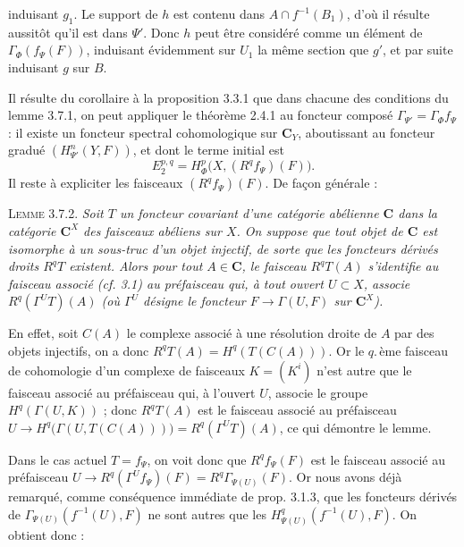 
\noindent induisant $g_1$. Le support de $h$ est contenu dans
$A\cap f^{-1}(B_1)$, d'où il résulte aussitôt qu'il est dans $\Psi'$. Donc
$h$ peut être considéré comme un élément de $\Gamma_\Phi(f_\Psi(F))$,
induisant évidemment sur $U_1$ la même section que $g'$, et par suite
induisant $g$ sur $B$.

Il résulte du corollaire à la proposition 3.3.1 que dans chacune des conditions
du lemme 3.7.1, on peut appliquer le théorème 2.4.1 au foncteur composé
$\Gamma_{\Psi'}=\Gamma_\Phi f_\Psi$ : il existe un foncteur spectral
cohomologique sur $\mathbf C_Y$, aboutissant au foncteur gradué
$(H^n_{\Psi'}(Y,F))$, et dont le terme initial est
\[
E_2^{p,q}=H^p_\Phi\bigl(X,(R^qf_\Psi)(F)\bigr).
\]
Il reste à expliciter les faisceaux $(R^qf_\Psi)(F)$. De façon générale :

\textsc{Lemme 3.7.2.} \textit{Soit $T$ un foncteur covariant
d'une catégorie abélienne $\mathbf C$ dans la catégorie $\mathbf C^X$ des faisceaux abéliens
sur $X$. On suppose que tout objet de $\mathbf C$ est isomorphe à un sous-truc d'un
objet injectif, de sorte que les foncteurs dérivés droits $R^qT$ existent.
Alors pour tout $A\in\mathbf C$, le faisceau $R^qT(A)$ s'identifie au faisceau associé
\textup{(}cf. \textup{3.1)} au préfaisceau qui, à tout ouvert $U\subset X$, associe
$R^q(\Gamma^U T)(A)$ \textup{(}où $\Gamma^U$ désigne le foncteur
$F\to\Gamma(U,F)$ sur $\mathbf C^X$\textup{)}.}

En effet, soit $C(A)$ le complexe associé à une résolution droite de $A$ par
des objets injectifs, on a donc $R^qT(A)=H^q(T(C(A)))$. Or le $q.$\,ème
faisceau de cohomologie d'un complexe de faisceaux $K=(K^i)$ n'est autre que
le faisceau associé au préfaisceau qui, à l'ouvert $U$, associe le groupe
$H^q(\Gamma(U,K))$ ; donc $R^qT(A)$ est le faisceau associé au préfaisceau
$U\to H^q\bigl(\Gamma(U,T(C(A)))\bigr)
=R^q(\Gamma^U T)(A)$,
ce qui démontre le lemme.

Dans le cas actuel $T=f_\Psi$, on voit donc que $R^qf_\Psi(F)$ est le faisceau
associé au préfaisceau
$U\to R^q(\Gamma^U f_\Psi)(F)=R^q\Gamma_{\Psi(U)}(F)$.
Or nous avons déjà remarqué, comme conséquence immédiate de prop. 3.1.3, que
les foncteurs dérivés de $\Gamma_{\Psi(U)}(f^{-1}(U),F)$ ne sont autres que
les $H^q_{\Psi(U)}(f^{-1}(U),F)$. On obtient donc :

